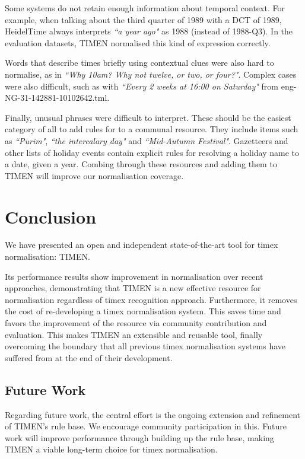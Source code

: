 \documentclass[10pt, a4paper]{article}
\begin{document}
Some systems do not retain enough information about temporal context. For example, when talking about the third quarter of 1989 with a DCT of 1989, HeidelTime always interprets \emph{``a year ago"} as 1988 (instead of 1988-Q3). In the evaluation datasets, TIMEN normalised this kind of expression correctly.

Words that describe times briefly using contextual clues were also hard to normalise, as in \emph{``Why 10am? Why not twelve, or two, or four?"}. Complex cases were also difficult, such as with \emph{``Every 2 weeks at 16:00 on Saturday"} from eng-NG-31-142881-10102642.tml.

Finally, unusual phrases were difficult to interpret. These should be the easiest category of all to add rules for to a communal resource. They include items such as \emph{``Purim"}, \emph{``the intercalary day"} and \emph{``Mid-Autumn Festival"}.
Gazetteers and other lists of holiday events contain explicit rules for resolving a holiday name to a date, given a year. Combing through these resources and adding them to TIMEN will improve our normalisation coverage.

\section{Conclusion}

We have presented an open and independent state-of-the-art tool for timex normalisation: TIMEN.

Its performance results show improvement in normalisation over recent approaches, demonstrating that TIMEN is a new effective resource for normalisation regardless of timex recognition approach.
Furthermore, it removes the cost of re-developing a timex normalisation system.
This saves time and favors the improvement of the resource via community contribution and evaluation. 
This makes TIMEN an extensible and reusable tool, finally overcoming the boundary that all previous timex normalisation systems have suffered from at the end of their development.

\subsection{Future Work}
Regarding future work, the central effort is the ongoing extension and refinement of TIMEN's rule base. We encourage community participation in this. 
Future work will improve performance through building up the rule base, making TIMEN a viable long-term choice for timex normalisation.
\end{document}
